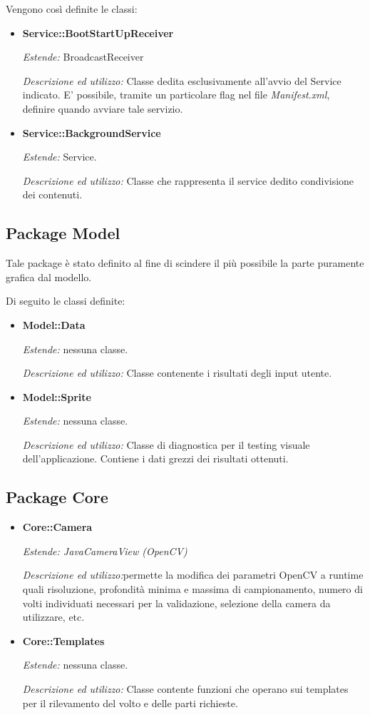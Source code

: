 Vengono così definite le classi:
\begin{itemize}


\item \textbf{Service::BootStartUpReceiver}

\textit{Estende:} BroadcastReceiver

\textit{Descrizione ed utilizzo:} Classe dedita esclusivamente all'avvio del Service indicato. E' possibile, tramite un particolare flag nel file \textit{Manifest.xml}, definire quando avviare tale servizio.

\item \textbf{Service::BackgroundService}

\textit{Estende:} Service. 

\textit{Descrizione ed utilizzo:} Classe che rappresenta il service dedito condivisione dei contenuti.
\end{itemize}

\subsection{Package Model}

Tale package è stato definito al fine di scindere il più possibile la parte puramente grafica dal modello.

Di seguito le classi definite:
\begin{itemize}

\item \textbf{Model::Data}

\textit{Estende:} nessuna classe.

\textit{Descrizione ed utilizzo:} Classe contenente i risultati degli input utente.

\item \textbf{Model::Sprite}

\textit{Estende:} nessuna classe.

\textit{Descrizione ed utilizzo:} Classe di diagnostica per il testing visuale dell'applicazione. Contiene i dati grezzi dei risultati ottenuti.

\end{itemize}
\subsection{Package Core}

\begin{itemize}
\item \textbf{Core::Camera}

\textit{Estende: JavaCameraView (OpenCV)}

\textit{Descrizione ed utilizzo:}permette la modifica dei parametri OpenCV a runtime quali risoluzione, profondità minima e massima di campionamento, numero di volti individuati necessari per la validazione, selezione della camera da utilizzare, etc.

\item \textbf{Core::Templates}

\textit{Estende:} nessuna classe. 

\textit{Descrizione ed utilizzo:} Classe contente funzioni che operano sui templates per il rilevamento del volto e delle parti richieste.
\end{itemize}
